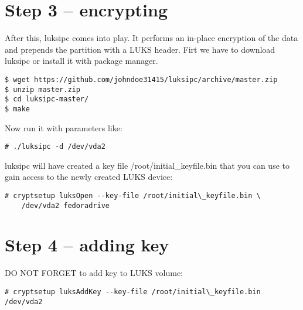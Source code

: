 \section{Step 3 -- encrypting}
After this, luksipc comes into play. It performs an in-place encryption of the data and prepends the partition with a LUKS header. Firt we have to download luksipc or install it with package manager.
\begin{lstlisting}[columns=fixed,basicstyle=\ttfamily\footnotesize,tabsize=4,backgroundcolor=\color{yellow!10}]
$ wget https://github.com/johndoe31415/luksipc/archive/master.zip
$ unzip master.zip
$ cd luksipc-master/
$ make
\end{lstlisting}
Now run it with parameters like:
\begin{lstlisting}[columns=fixed,basicstyle=\ttfamily\footnotesize,tabsize=4,backgroundcolor=\color{yellow!10}]
# ./luksipc -d /dev/vda2
\end{lstlisting}
luksipc will have created a key file /root/initial\_keyfile.bin that you can use to gain access to the newly created LUKS device:
\begin{lstlisting}[columns=fixed,basicstyle=\ttfamily\footnotesize,tabsize=4,backgroundcolor=\color{yellow!10}]
# cryptsetup luksOpen --key-file /root/initial\_keyfile.bin \
    /dev/vda2 fedoradrive
\end{lstlisting}



\section{Step 4 -- adding key}
DO NOT FORGET to add key to LUKS volume:
\begin{lstlisting}[columns=fixed,basicstyle=\ttfamily\footnotesize,tabsize=4,backgroundcolor=\color{yellow!10}]
# cryptsetup luksAddKey --key-file /root/initial\_keyfile.bin /dev/vda2
\end{lstlisting}
